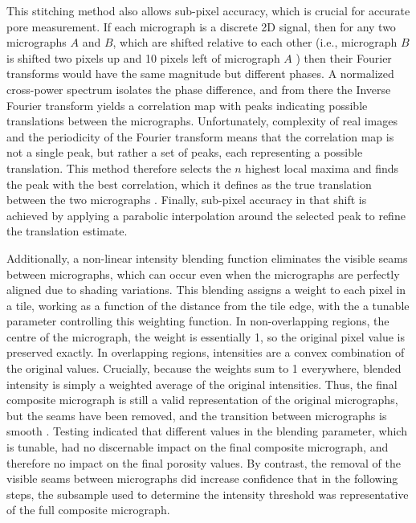 \documentclass[3p,twocolumn]{elsarticle}
\begin{document}
This stitching method also allows sub-pixel accuracy, which is crucial for
accurate pore measurement. If each micrograph is a discrete 2D signal, then for
any two micrographs \(A\) and \(B\), which are shifted relative to each other
(i.e., micrograph \(B\) is shifted two pixels up and 10 pixels left of
micrograph \(A\) ) then their Fourier transforms would have the same magnitude
but different phases. A normalized cross-power spectrum isolates the phase
difference, and from there the Inverse Fourier transform yields a correlation
map with peaks indicating possible translations between the micrographs.
Unfortunately, complexity of real images and the periodicity of the Fourier
transform means that the correlation map is not a single peak, but rather a set
of peaks, each representing a possible translation. This method therefore
selects the \(n\) highest local maxima and finds the peak with the best
correlation, which it defines as the true translation between the two
micrographs \citep{Preibisch2009}. Finally, sub-pixel accuracy in that shift is
achieved by applying a parabolic interpolation around the selected peak to
refine the translation estimate.

Additionally, a non-linear intensity blending function eliminates the visible
seams between micrographs, which can occur even when the micrographs are
perfectly aligned due to shading variations. This blending assigns a weight to
each pixel in a tile, working as a function of the distance from the tile edge,
with the a tunable parameter controlling this weighting function. In
non-overlapping regions, the centre of the micrograph, the weight is essentially
1, so the original pixel value is preserved exactly. In overlapping regions,
intensities are a convex combination of the original values. Crucially, because
the weights sum to 1 everywhere, blended intensity is simply a weighted average
of the original intensities. Thus, the final composite micrograph is still a
valid representation of the original micrographs, but the seams have been
removed, and the transition between micrographs is smooth \citep{Preibisch2009)}.
Testing indicated that different values in the blending parameter, which is
tunable, had no discernable impact on the final composite micrograph, and
therefore no impact on the final porosity values. By contrast, the removal of the
visible seams between micrographs did increase confidence that in the following
steps, the subsample used to determine the intensity threshold was
representative of the full composite micrograph.
\end{document}
